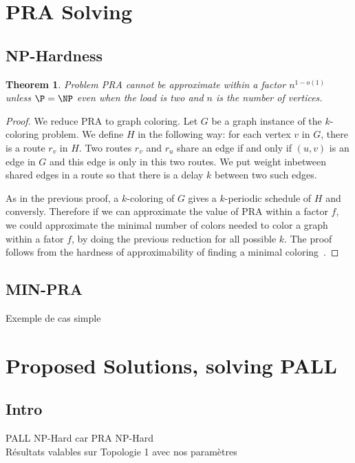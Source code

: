 \documentclass[a4paper,10pt]{article}
\newtheorem{theorem}{Theorem}
\begin{document}
	

  
\section{PRA Solving}
  
  \subsection{NP-Hardness}
	
   
    \begin{theorem}
    Problem PRA cannot be approximate within a factor $n^{1-o(1)}$ unless $\P = \NP$ even when the load is two
    and $n$ is the number of vertices.
    \end{theorem}

    \begin{proof}
    We reduce PRA to graph coloring. Let $G$ be a graph instance of the $k$-coloring problem. 
    We define $H$ in the following way: for each vertex $v$ in $G$, there is a route $r_v$ in $H$.
    Two routes $r_v$ and $r_u$ share an edge if and only if $(u,v)$ is an edge in $G$ and this edge is only in this two routes. 
    We put weight inbetween shared edges in a route so that there is a delay $k$ between two such edges. 
    
    As in the previous proof, a $k$-coloring of $G$ gives a $k$-periodic schedule of $H$
    and conversly. Therefore if we can approximate the value of PRA  within a factor $f$,
    we could approximate the minimal number of colors needed to color a graph within a fator $f$, 
    by doing the previous reduction for all possible $k$. The proof follows from the hardness of approximability
    of finding a minimal coloring~\cite{zuckerman2006linear}.
    \end{proof}


   
  \subsection{MIN-PRA}
    Exemple de cas simple
    
\section{Proposed Solutions, solving PALL}

  \subsection{Intro}
    PALL NP-Hard car PRA NP-Hard\\
    Résultats valables sur Topologie 1 avec nos paramètres
    
\end{document}
